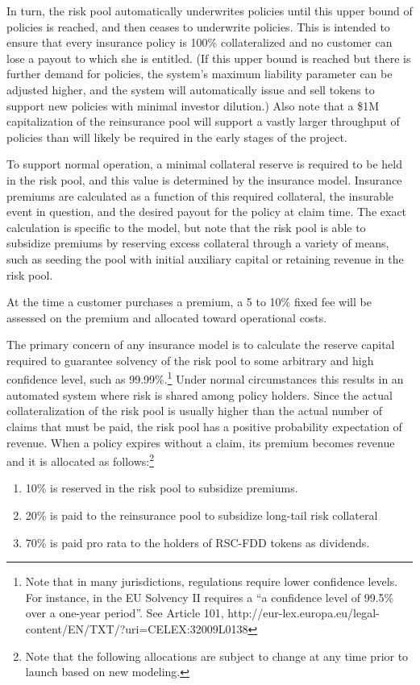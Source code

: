 \documentclass[12pt]{article}
\begin{document}
In turn, the risk pool automatically underwrites policies until this upper bound of policies is reached, and then ceases to underwrite policies. This is intended to ensure that every insurance policy is 100\% collateralized and no customer can lose a payout to which she is entitled. (If this upper bound is reached but there is further demand for policies, the system's maximum liability parameter can be adjusted higher, and the system will automatically issue and sell tokens to support new policies with minimal investor dilution.) Also note that a \$1M capitalization of the reinsurance pool will support a vastly larger throughput of policies than will likely be required in the early stages of the project.

To support normal operation, a minimal collateral reserve is required to be held in the risk pool, and this value is determined by the insurance model. Insurance premiums are calculated as a function of this required collateral, the insurable event in question, and the desired payout for the policy at claim time. The exact calculation is specific to the model, but note that the risk pool is able to subsidize premiums by reserving excess collateral through a variety of means, such as seeding the pool with initial auxiliary capital or retaining revenue in the risk pool.

At the time a customer purchases a premium, a 5 to 10\% fixed fee will be assessed on the premium and allocated toward operational costs.

The primary concern of any insurance model is to calculate the reserve capital required to guarantee solvency of the risk pool to some arbitrary and high confidence level, such as 99.99\%.\footnote{Note that in many jurisdictions, regulations require lower confidence levels. For instance, in the EU Solvency II requires a ``a confidence level of 99.5\% over a one-year period''. See Article 101, http://eur-lex.europa.eu/legal-content/EN/TXT/?uri=CELEX:32009L0138} Under normal circumstances this results in an automated system where risk is shared among policy holders. Since the actual collateralization of the risk pool is usually higher than the actual number of claims that must be paid, the risk pool has a positive probability expectation of revenue. When a policy expires without a claim, its premium becomes revenue and it is allocated as follows:\footnote{Note that the following allocations are subject to change at any time prior to launch based on new modeling.}

\begin{enumerate}
    \item 10\% is reserved in the risk pool to subsidize premiums.
    \item 20\% is paid to the reinsurance pool to subsidize long-tail risk collateral
    \item 70\% is paid pro rata to the holders of RSC-FDD tokens as dividends.
\end{enumerate}
\end{document}
